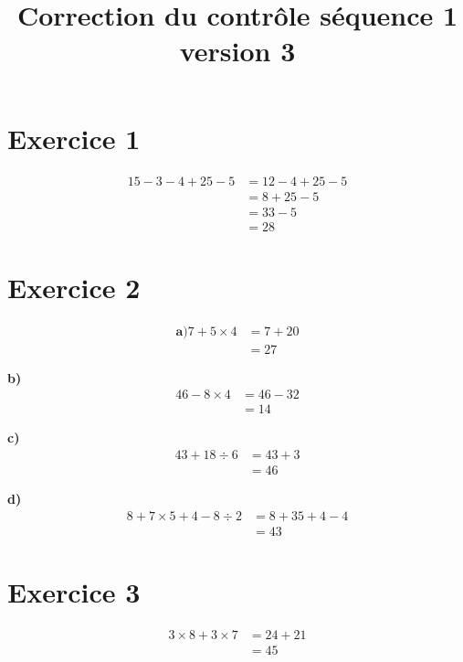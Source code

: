 \documentclass[12pt]{extarticle}
\title{\textbf{Correction du contrôle séquence 1 version 3}}
\author{}
\date{}
\begin{document}
\maketitle

\section*{Exercice 1}
\begin{align*}
15 - 3 - 4 + 25 - 5 &= 12 - 4 + 25 - 5 \\
                     &= 8 + 25 - 5 \\
                     &= 33 - 5 \\
                     &= 28
\end{align*}

\section*{Exercice 2}

\begin{align*}
\textbf{a)}
7 + 5 \times 4 &= 7 + 20 \\
               &= 27
\end{align*}

\textbf{b)}
\begin{align*}
46 - 8 \times 4 &= 46 - 32 \\
                &= 14
\end{align*}

\textbf{c)}
\begin{align*}
43 + 18 \div 6 &= 43 + 3 \\
               &= 46
\end{align*}

\textbf{d)}
\begin{align*}
8 + 7 \times 5 + 4 - 8 \div 2 &= 8 + 35 + 4 - 4 \\
                              &= 43
\end{align*}

\section*{Exercice 3}
\begin{align*}
3 \times 8 + 3 \times 7 &= 24 + 21 \\
                        &= 45
\end{align*}
\end{document}
